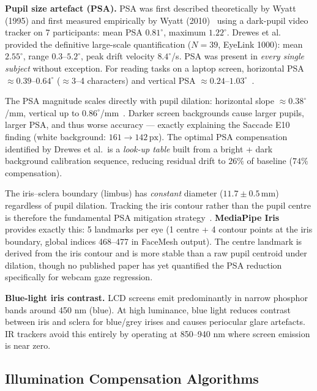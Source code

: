 \documentclass[11pt,a4paper]{article}
\begin{document}
\textbf{Pupil size artefact (PSA).}
PSA was first described theoretically by Wyatt (1995) and first measured empirically by
Wyatt (2010)~\cite{wyatt2010pupil} using a dark-pupil video tracker on 7 participants:
mean PSA $0.81^\circ$, maximum $1.22^\circ$.
Drewes et al.~\cite{drewes2014psa} provided the definitive large-scale quantification
($N=39$, EyeLink 1000):
mean $\mathbf{2.55^\circ}$, range $0.3$--$5.2^\circ$, peak drift velocity $8.4^\circ$/s.
PSA was present in \emph{every single subject} without exception.
For reading tasks on a laptop screen, horizontal PSA $\approx0.39$--$0.64^\circ$
($\approx3$--4 characters) and vertical PSA $\approx0.24$--$1.03^\circ$~\cite{psa2024}.

The PSA magnitude scales directly with pupil dilation:
horizontal slope $\approx0.38^\circ$/mm, vertical up to $0.86^\circ$/mm~\cite{hooge2021psa}.
Darker screen backgrounds cause larger pupils, larger PSA, and thus worse accuracy ---
exactly explaining the Saccade E10 finding (white background: $161\to142\,\text{px}$).
The optimal PSA compensation identified by Drewes et al.\ is a \emph{look-up table}
built from a bright + dark background calibration sequence, reducing residual drift
to $26\%$ of baseline ($74\%$ compensation).

The iris--sclera boundary (limbus) has \emph{constant} diameter ($11.7\pm0.5\,\text{mm}$)
regardless of pupil dilation.
Tracking the iris contour rather than the pupil centre is therefore the fundamental
PSA mitigation strategy~\cite{irissometry2022}.
\textbf{MediaPipe Iris}~\cite{ablavatski2020mediapipe} provides exactly this:
5 landmarks per eye (1 centre + 4 contour points at the iris boundary, global indices 468--477
in FaceMesh output).
The centre landmark is derived from the iris contour and is more stable than a raw
pupil centroid under dilation, though no published paper has yet quantified the PSA
reduction specifically for webcam gaze regression.

\textbf{Blue-light iris contrast.}
LCD screens emit predominantly in narrow phosphor bands around 450 nm (blue).
At high luminance, blue light reduces contrast between iris and sclera for
blue/grey irises and causes periocular glare artefacts.
IR trackers avoid this entirely by operating at 850--940 nm where screen emission
is near zero.

\subsection{Illumination Compensation Algorithms}
\end{document}
